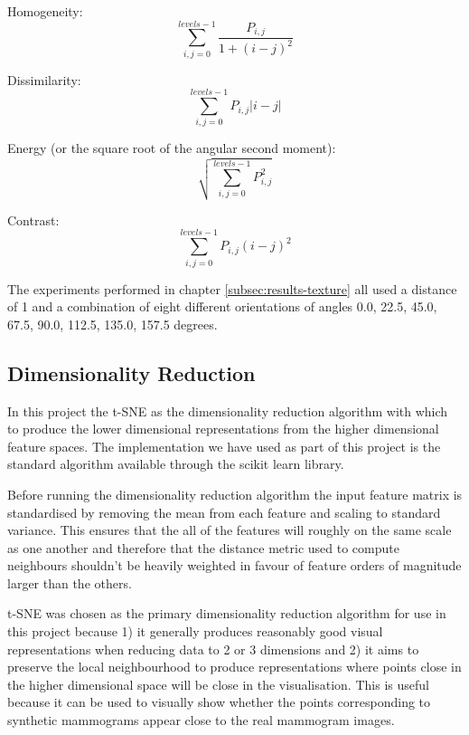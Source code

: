 Homogeneity:
\begin{equation}
	\sum\limits_{i,j=0}^{levels-1} \frac{P_{i,j}}{1+(i-j)^2}
\end{equation}

Dissimilarity:
\begin{equation}
	\sum\limits_{i,j=0}^{levels-1} P_{i,j}|i-j|
\end{equation}

Energy (or the square root of the angular second moment):
\begin{equation}
	\sqrt{ \sum\limits_{i,j=0}^{levels-1} P_{i,j}^2 }
\end{equation}

Contrast:
\begin{equation}
	\sum\limits_{i,j=0}^{levels-1} P_{i,j}(i-j)^2
\end{equation}

The experiments performed in chapter \ref{subsec:results-texture} all used a distance of 1 and a combination of eight different orientations of angles 0.0, 22.5, 45.0, 67.5, 90.0, 112.5, 135.0, 157.5 degrees.


\subsection{Dimensionality Reduction}
In this project the t-SNE as the dimensionality reduction algorithm with which to produce the lower dimensional representations from the higher dimensional feature spaces. The implementation we have used as part of this project is the standard algorithm available through the scikit learn library. 

Before running the dimensionality reduction algorithm the input feature matrix is standardised by removing the mean from each feature and scaling to standard variance. This ensures that the all of the features will roughly on the same scale as one another and therefore that the distance metric used to compute neighbours shouldn't be heavily weighted in favour of feature orders of magnitude larger than the others.

t-SNE was chosen as the primary dimensionality reduction algorithm for use in this project because 1) it generally produces reasonably good visual representations when reducing data to 2 or 3 dimensions and 2) it aims to preserve the local neighbourhood to produce representations where points close in the higher dimensional space will be close in the visualisation. This is useful because it can be used to visually show whether the points corresponding to synthetic mammograms appear close to the real mammogram images.

